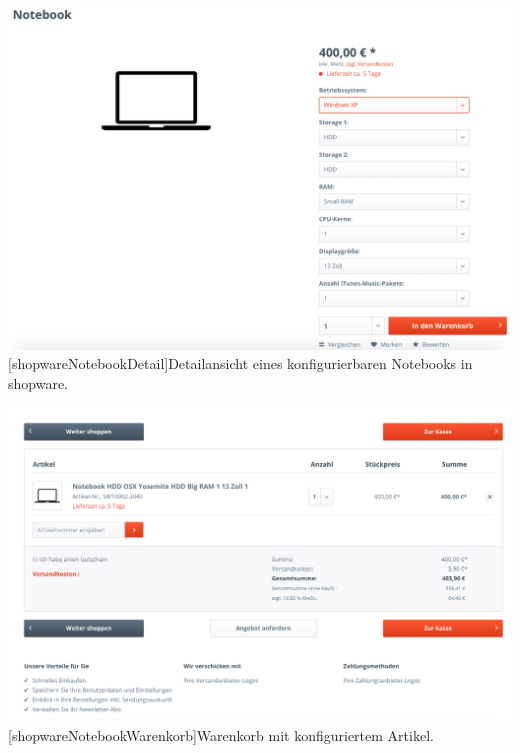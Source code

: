 \begin{appendix}
\vspace{1em}
\begin{minipage}{\linewidth}
	\centering
	\includegraphics[width=1\linewidth]{Abbildungen/shopwareNotebookDetail.png}
	[shopwareNotebookDetail]{Detailansicht eines konfigurierbaren Notebooks in shopware.}
	\label{app:shopwareNotebookDetail}
\end{minipage}
\vspace{1em}

\vspace{1em}
\begin{minipage}{\linewidth}
	\centering
	\includegraphics[width=1\linewidth]{Abbildungen/shopwareNotebookWarenkorb.png}
	[shopwareNotebookWarenkorb]{Warenkorb mit konfiguriertem Artikel.}
	\label{app:shopwareNotebookWarenkorb}
\end{minipage}
\vspace{1em}


\end{appendix}
